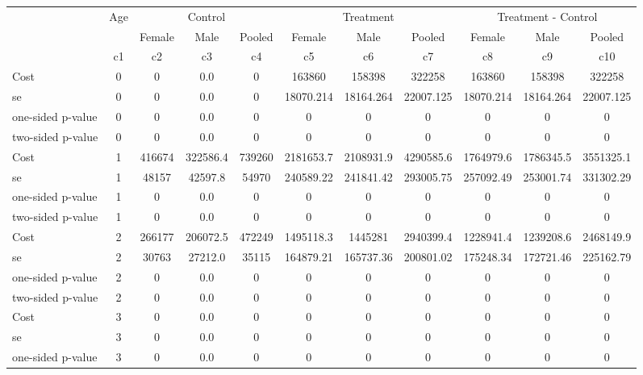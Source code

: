 \begin{tabular}{lcccccccccc} \hline \hline
 &Age & \multicolumn{3}{c}{Control} & \multicolumn{3}{c}{Treatment} & \multicolumn{3}{c}{Treatment - Control} \\ 
& & Female  & Male  & Pooled  & Female  & Male  & Pooled  & Female  & Male  & Pooled  \\  \hline  & c1  & c2  & c3  & c4  & c5  & c6  & c7  & c8  & c9  & c10  \\  \hline 
Cost 			 &         0 &         0 &       0.0 &         0 & 163860 & 158398 & 322258 & 163860 & 158398 & 322258 \\  
se 				 &         0 &         0 &       0.0 &         0 & 18070.214 & 18164.264 & 22007.125 & 18070.214 & 18164.264 & 22007.125 \\  
one-sided p-value &         0 &         0 &       0.0 &         0 & 0 & 0 & 0 & 0 & 0 & 0 \\  
two-sided p-value &         0 &         0 &       0.0 &         0 & 0 & 0 & 0 & 0 & 0 & 0 \\  
Cost 			  &         1 &    416674 &  322586.4 &    739260 & 2181653.7 & 2108931.9 & 4290585.6 & 1764979.6 & 1786345.5 & 3551325.1 \\  
se 				  &         1 &     48157 &   42597.8 &     54970 & 240589.22 & 241841.42 & 293005.75 & 257092.49 & 253001.74 & 331302.29 \\  
one-sided p-value &         1 &         0 &       0.0 &         0 & 0 & 0 & 0 & 0 & 0 & 0 \\  
two-sided p-value &         1 &         0 &       0.0 &         0 & 0 & 0 & 0 & 0 & 0 & 0 \\  
Cost 			  &         2 &    266177 &  206072.5 &    472249 & 1495118.3 & 1445281 & 2940399.4 & 1228941.4 & 1239208.6 & 2468149.9 \\  
se 				  &         2 &     30763 &   27212.0 &     35115 & 164879.21 & 165737.36 & 200801.02 & 175248.34 & 172721.46 & 225162.79 \\  
one-sided p-value &         2 &         0 &       0.0 &         0 & 0 & 0 & 0 & 0 & 0 & 0 \\  
two-sided p-value &         2 &         0 &       0.0 &         0 & 0 & 0 & 0 & 0 & 0 & 0 \\  
Cost 			  &         3 &         0 &       0.0 &         0 & 0 & 0 & 0 & 0 & 0 & 0 \\  
se 				  &         3 &         0 &       0.0 &         0 & 0 & 0 & 0 & 0 & 0 & 0 \\  
one-sided p-value &         3 &         0 &       0.0 &         0 & 0 & 0 & 0 & 0 & 0 & 0 \\  

\end{tabular}
